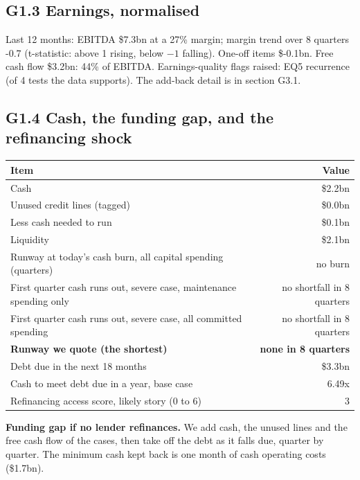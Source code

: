 \documentclass[11pt,a4paper]{article}
\begin{document}
\subsection*{G1.3 Earnings, normalised}
Last 12 months: EBITDA \$7.3bn at a 27\% margin; margin trend over 8 quarters -0.7 (t-statistic: above 1 rising, below $-1$ falling). One-off items \$-0.1bn. Free cash flow \$3.2bn: 44\% of EBITDA. Earnings-quality flags raised: EQ5 recurrence (of 4 tests the data supports). The add-back detail is in section G3.1.
\subsection*{G1.4 Cash, the funding gap, and the refinancing shock}
\begin{center}\footnotesize\setlength{\tabcolsep}{3.5pt}\begin{tabular}{@{}lr@{}}\toprule
Item & Value \\\midrule
Cash & \$2.2bn \\
Unused credit lines (tagged) & \$0.0bn \\
Less cash needed to run & \$0.1bn \\
Liquidity & \$2.1bn \\
Runway at today's cash burn, all capital spending (quarters) & no burn \\
First quarter cash runs out, severe case, maintenance spending only & no shortfall in 8 quarters \\
First quarter cash runs out, severe case, all committed spending & no shortfall in 8 quarters \\
\textbf{Runway we quote (the shortest)} & \textbf{none in 8 quarters} \\
Debt due in the next 18 months & \$3.3bn \\
Cash to meet debt due in a year, base case & 6.49x \\
Refinancing access score, likely story (0 to 6) & 3 \\
\bottomrule\end{tabular}\end{center}
\textbf{Funding gap if no lender refinances.} We add cash, the unused lines and the free cash flow of the cases, then take off the debt as it falls due, quarter by quarter. The minimum cash kept back is one month of cash operating costs (\$1.7bn).
\end{document}
